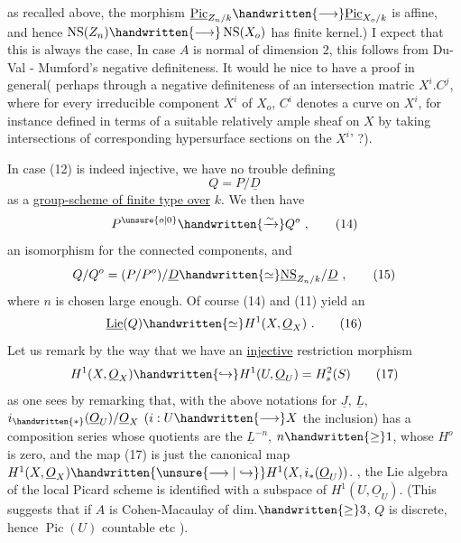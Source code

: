 as recalled above, the morphism $\underline{\operatorname{Pic}}_{Z_n/k}\handwritten{\longrightarrow}\underline{\operatorname{Pic}}_{X_o/k}$ is affine, and hence $\operatorname{NS}(Z_n)\handwritten{\longrightarrow}\operatorname{NS}(X_o)$ has finite kernel.) I expect that this is always the case,  In case $A$ is normal of dimension $2$, this follows from Du-Val - Mumford's negative definiteness. It would he nice to have a proof in general( perhaps through a negative definiteness of an intersection matric $X^i.C^j$, where for every irreducible component $X^i$ of $X_o$, $C^i$ denotes a  curve on $X^i$, for instance defined in terms of a suitable  relatively ample sheaf on $X$ by taking intersections of corresponding hypersurface sections on the $X^i$' ?).

In case (12) is indeed injective, we have no trouble defining
\[
Q=P/\underline{D}
\tag*{(13)}
\]
as a \uline{group-scheme  of finite type over} $k$. We then have
\[
P^{\unsure{o|0}}\handwritten{\xrightarrow{\sim}}Q^o\ ,
\tag*{(14)}
\]
an isomorphism for the connected components, and
\[
Q/Q^o=(P/P^o)/\underline{D}\handwritten{\simeq}\underline{\operatorname{NS}}_{Z_n/k}/\underline{D}\ ,
\tag*{(15)}
\]
where $n$ is chosen large enough. Of course (14) and (11) yield an 
\[
\underline{\operatorname{Lie}}(Q)\handwritten{\simeq}H^1(X,\underline{O}_X)\ .
\tag*{(16)}
\]
Let us remark by the way that we have an \uline{injective} restriction morphism
\[
H^1(X,\underline{O}_X)\handwritten{\hookrightarrow}H^1(U,\underline{O}_U)=H_s^2(S)
\tag*{(17)}
\]
as one sees by remarking that, with the above notations for $\underline{J}$, $\underline{L}$,   $i_{\handwritten{*}}(\underline{O}_U)/\underline{O}_X$ $(i:U\handwritten{\longrightarrow}X$ the inclusion) has a composition series whose quotients are the $\underline{L}^{-n}$, $n\handwritten{\geq}1$, whose $H^o$ is zero, and the map (17) is just the canonical map $H^1(X,\underline{O}_X)\handwritten{\unsure{\longrightarrow|\hookrightarrow}}H^1(X,i_*(\underline{O}_U))$. , the Lie algebra of the local Picard scheme is identified with a subspace of $H^1(U,\underline{O}_U)$. (This suggests that if $A$ is Cohen-Macaulay of dim.$\handwritten{\geq}3$, $Q$ is discrete, hence $\operatorname{Pic}(U)$ countable etc ).
